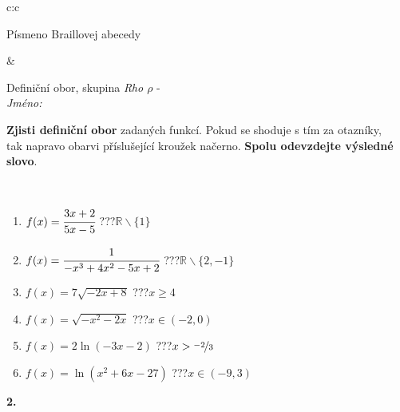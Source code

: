 \documentclass[10pt]{report}
\begin{document}
\begin{tabular}{c:c}
\begin{minipage}[c][104.5mm][t]{0.5\linewidth}
\begin{center}
\begin{minipage}{0.20\linewidth}
\begin{center}
{\small Písmeno Braillovej abecedy}
\end{center}
\end{minipage}
\end{center}
\end{minipage}
&
\begin{minipage}[c][104.5mm][t]{0.5\linewidth}
\begin{center}
\vspace{7mm}
{\huge Definiční obor, skupina \textit{Rho $\rho$} -}\\[5mm]
\textit{Jméno:}\phantom{xxxxxxxxxxxxxxxxxxxxxxxxxxxxxxxxxxxxxxxxxxxxxxxxxxxxxxxxxxxxxxxxx}\\[5mm]
\begin{minipage}{0.95\linewidth}
\begin{center}
\textbf{Zjisti definiční obor} zadaných funkcí. Pokud se shoduje s tím za otazníky,\\tak napravo obarvi příslušející kroužek načerno. \textbf{Spolu odevzdejte výsledné slovo}.
\end{center}
\end{minipage}
\\[1mm]
\begin{minipage}{0.79\linewidth}
\begin{center}
\begin{varwidth}{\linewidth}
\begin{enumerate}
\normalsizerrr
\item $f(x)=\cfrac{3x+2}{5x-5}$\quad \dotfill\; ???\;\dotfill \quad $\mathbb{R}\smallsetminus\{1\}$
\item $f(x)=\cfrac{1}{-x^3+4x^2-5x+2}$\quad \dotfill\; ???\;\dotfill \quad $\mathbb{R}\smallsetminus\{2,-1\}$
\item $f(x)=7\sqrt{-2x+8}$\quad \dotfill\; ???\;\dotfill \quad $x\geq4$
\item $f(x)=\sqrt{-x^2-2x}$\quad \dotfill\; ???\;\dotfill \quad $x\in(-2 , 0)$
\item $f(x)=2\ln{(-3x-2)}$\quad \dotfill\; ???\;\dotfill \quad $x>\nicefrac{-2}{3}$
\item $f(x)=\ln{(x^2+6x-27)}$\quad \dotfill\; ???\;\dotfill \quad $x\in(-9 , 3)$
\end{enumerate}
\end{varwidth}
\end{center}
\end{minipage}
\begin{minipage}{0.20\linewidth}
\begin{center}
{\Huge\bfseries 2.} \\[2mm]

\end{center}
\end{minipage}
\end{center}
\end{minipage}
\end{tabular}
\end{document}
